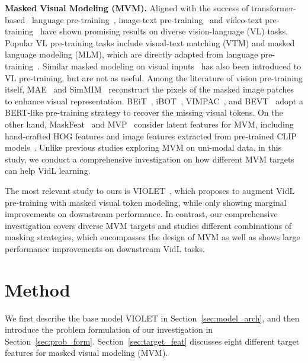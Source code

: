 \documentclass[10pt,twocolumn,letterpaper]{article}
\newcommand{\modelorig}{VIOLET\xspace}
\begin{document}
\vspace{0.5ex}
\noindent \textbf{Masked Visual Modeling (MVM).}
Aligned with the success of transformer-based~\cite{vaswani2017attention} language pre-training~\cite{lan2019albert,liu2019roberta}, image-text pre-training~\cite{chen2020uniter,tan2019lxmert} and video-text pre-training~\cite{kim2021sspt-crl-vqa,yang2020bert-vqa,yang2021just-ask} have shown promising results on diverse vision-language (VL) tasks. Popular VL pre-training tasks include visual-text matching (VTM) and masked language modeling (MLM), which are directly adapted from language pre-training~\cite{devlin2019bert}. Similar masked modeling on visual inputs~\cite{chen2020uniter,li2020hero,dou2022empirical} has also been introduced to VL pre-training, but are not as useful. Among the literature of vision pre-training itself, MAE~\cite{he2022mae, tong22video-mae} and SimMIM~\cite{xie2022simmim} reconstruct the pixels of the masked image patches to enhance visual representation. BEiT~\cite{bao2022beit}, iBOT~\cite{zhou2022ibot}, VIMPAC~\cite{tan2021vimpac}, and BEVT~\cite{wang2022bevt} adopt a BERT-like pre-training strategy to recover the missing visual tokens. On the other hand, MaskFeat~\cite{wei2021masked-feat} and MVP~\cite{wei2022mvp} consider latent features for MVM, including hand-crafted HOG features and image features extracted from pre-trained CLIP models~\cite{radford2021clip}. Unlike previous studies exploring MVM on uni-modal data, in this study, we conduct a comprehensive investigation on how different MVM targets can help VidL learning.

The most relevant study to ours is VIOLET~\cite{fu2021violet}, which proposes to augment VidL pre-training with masked visual token modeling, while only showing marginal improvements on downstream performance. In contrast, our comprehensive investigation covers diverse MVM targets and studies different combinations of masking strategies, which encompasses the design of MVM as well as shows large performance improvements on downstream VidL tasks.

\section{Method} \label{sec:method}


We first describe the base model \modelorig 
in Section~\ref{sec:model_arch}, and then introduce the problem formulation of our investigation in Section~\ref{sec:prob_form}. Section~\ref{sec:target_feat} discusses eight different target features for masked visual modeling (MVM).
\end{document}
